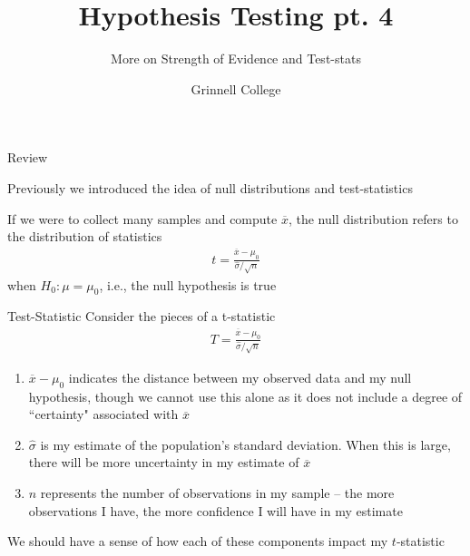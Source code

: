 \documentclass{beamer}
\title[Introduction to Statistics]{Hypothesis Testing pt. 4}
\subtitle{More on Strength of Evidence and Test-stats}
\author{Grinnell College}
\date{}
\begin{document}
\begin{frame}
  \titlepage
\end{frame}

\begin{frame}{Review}

Previously we introduced the idea of null distributions and test-statistics \\ \vspace{8mm}

If we were to collect many samples and compute $\overline{x}$, the null distribution refers to the distribution of statistics
\begin{align*}
t = \frac{\overline{x} - \mu_0}{\hat{\sigma}/\sqrt{n}}
\end{align*}
when $H_0:\mu = \mu_0$, i.e., the null hypothesis is true
\end{frame}

\begin{frame}{Test-Statistic}
\small
Consider the pieces of a t-statistic
\begin{align*}
T = \frac{\overline{x} - \mu_0}{\hat{\sigma}/\sqrt{n}}
\end{align*}
\begin{enumerate}
\item  $\overline{x} - \mu_0$ indicates the distance between my observed data and my null hypothesis, though we cannot use this alone as it does not include a degree of ``certainty" associated with $\overline{x}$
\item $\hat{\sigma}$ is my estimate of the population's standard deviation. When this is large, there will be more uncertainty in my estimate of $\overline{x}$
\item $n$ represents the number of observations in my sample -- the more observations I have, the more confidence I will have in my estimate 
\end{enumerate} \vspace{2mm}
We should have a sense of how each of these components impact my $t$-statistic
\end{frame}
\end{document}

